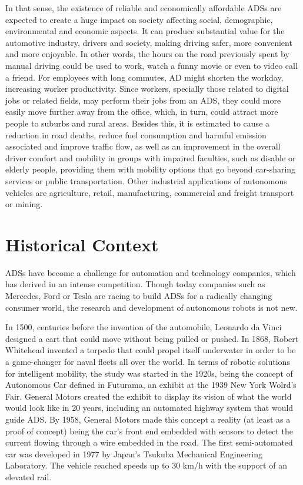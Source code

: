 In that sense, the existence of reliable and economically affordable \acp{ADS} are expected to create a huge impact on society affecting social, demographic, environmental and economic aspects. It can produce substantial value for the automotive industry, drivers and society, making driving safer, more convenient and more enjoyable. In other words, the hours on the road previously spent by manual driving could be used to work, watch a funny movie or even to video call a friend. For employees with long commutes, \ac{AD} might shorten the workday, increasing worker productivity. Since workers, specially those related to digital jobs or related fields, may perform their jobs from an \ac{ADS}, they could more easily move further away from the office, which, in turn, could attract more people to suburbs and rural areas. Besides this, it is estimated to cause a reduction in road deaths, reduce fuel consumption and harmful emission associated and improve traffic flow, as well as an improvement in the overall driver comfort and mobility in groups with impaired faculties, such as disable or elderly people, providing them with mobility options that go beyond car-sharing services or public transportation. Other industrial applications of autonomous vehicles are agriculture, retail, manufacturing, commercial and freight transport or mining. 

\section{Historical Context}
\label{sec:1_historical_context}

\acp{ADS} have become a challenge for automation and technology companies, which has derived in an intense competition. Though today companies such as Mercedes, Ford or Tesla are racing to build \acp{ADS} for a radically changing consumer world, the research and development of autonomous robots is not new.

In 1500, centuries before the invention of the automobile, Leonardo da Vinci designed a cart that could move without being pulled or pushed. In 1868, Robert Whitehead invented a torpedo that could propel itself underwater in order to be a game-changer for naval fleets all over the world. In terms of robotic solutions for intelligent mobility, the study was started in the 1920s, being the concept of Autonomous Car defined in Futurama, an exhibit at the 1939 New York Wolrd's Fair. General Motors created the exhibit to display its vision of what the world would look like in 20 years, including an automated highway system that would guide \ac{ADS}. By 1958, General Motors made this concept a reality (at least as a proof of concept) being the car's front end embedded with sensors to detect the current flowing through a wire embedded in the road. The first semi-automated car was developed in 1977 by Japan’s Tsukuba Mechanical Engineering Laboratory. The vehicle reached speeds up to 30 km/h with the support of an elevated rail. 

